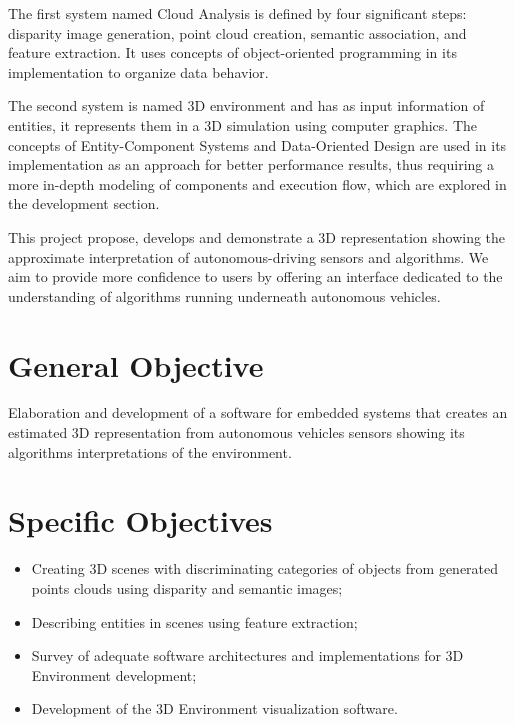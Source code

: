     The first system named Cloud Analysis is defined by four significant steps: disparity image generation, point cloud creation, semantic association, and feature extraction. It uses concepts of object-oriented programming \cite{object-oriented-modeling-and-design} in its implementation to organize data behavior.
    
    The second system is named 3D environment and has as input information of entities, it represents them in a 3D simulation using computer graphics. The concepts of Entity-Component Systems \cite{house-entity-component-explanation-stack} and Data-Oriented Design \cite{llopis-game-engine-gems-2} are used in its implementation as an approach for better performance results, thus requiring a more in-depth modeling of components and execution flow, which are explored in the development section.

    This project propose, develops and demonstrate a 3D representation showing the approximate interpretation of autonomous-driving sensors and algorithms. We aim to provide more confidence to users by offering an interface dedicated to the understanding of algorithms running underneath autonomous vehicles.

\section{General Objective}
    
    Elaboration and development of a software for embedded systems that creates an estimated 3D representation from autonomous vehicles sensors showing its algorithms interpretations of the environment.
    
\section{Specific Objectives}

\begin{itemize}
    \item Creating 3D scenes with discriminating categories of objects from generated points clouds using disparity and semantic images;
    \item Describing entities in scenes using feature extraction;
    \item Survey of adequate software architectures and implementations for 3D Environment development;
    \item Development of the 3D Environment visualization software.
\end{itemize}
